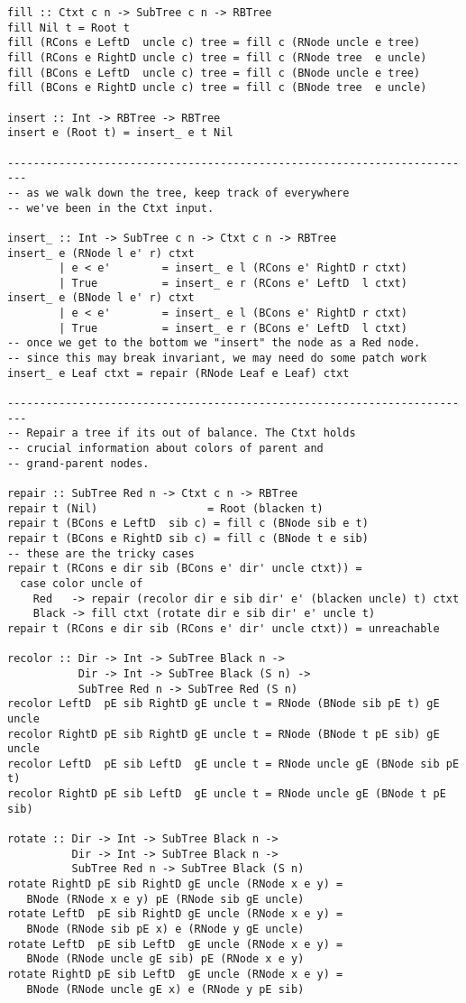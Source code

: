 \documentclass[11pt,twoside,A4]{llncs}
\begin{document}
{\begin{verbatim}
fill :: Ctxt c n -> SubTree c n -> RBTree
fill Nil t = Root t
fill (RCons e LeftD  uncle c) tree = fill c (RNode uncle e tree)
fill (RCons e RightD uncle c) tree = fill c (RNode tree  e uncle)
fill (BCons e LeftD  uncle c) tree = fill c (BNode uncle e tree)
fill (BCons e RightD uncle c) tree = fill c (BNode tree  e uncle)

insert :: Int -> RBTree -> RBTree
insert e (Root t) = insert_ e t Nil

-------------------------------------------------------------------------
-- as we walk down the tree, keep track of everywhere 
-- we've been in the Ctxt input.

insert_ :: Int -> SubTree c n -> Ctxt c n -> RBTree
insert_ e (RNode l e' r) ctxt
        | e < e'        = insert_ e l (RCons e' RightD r ctxt)
        | True          = insert_ e r (RCons e' LeftD  l ctxt)
insert_ e (BNode l e' r) ctxt
        | e < e'        = insert_ e l (BCons e' RightD r ctxt)
        | True          = insert_ e r (BCons e' LeftD  l ctxt)
-- once we get to the bottom we "insert" the node as a Red node.
-- since this may break invariant, we may need do some patch work
insert_ e Leaf ctxt = repair (RNode Leaf e Leaf) ctxt

-------------------------------------------------------------------------
-- Repair a tree if its out of balance. The Ctxt holds
-- crucial information about colors of parent and 
-- grand-parent nodes.

repair :: SubTree Red n -> Ctxt c n -> RBTree
repair t (Nil)                 = Root (blacken t)
repair t (BCons e LeftD  sib c) = fill c (BNode sib e t)
repair t (BCons e RightD sib c) = fill c (BNode t e sib)
-- these are the tricky cases
repair t (RCons e dir sib (BCons e' dir' uncle ctxt)) =
  case color uncle of
    Red   -> repair (recolor dir e sib dir' e' (blacken uncle) t) ctxt
    Black -> fill ctxt (rotate dir e sib dir' e' uncle t)
repair t (RCons e dir sib (RCons e' dir' uncle ctxt)) = unreachable

recolor :: Dir -> Int -> SubTree Black n ->
           Dir -> Int -> SubTree Black (S n) ->
           SubTree Red n -> SubTree Red (S n)
recolor LeftD  pE sib RightD gE uncle t = RNode (BNode sib pE t) gE uncle
recolor RightD pE sib RightD gE uncle t = RNode (BNode t pE sib) gE uncle
recolor LeftD  pE sib LeftD  gE uncle t = RNode uncle gE (BNode sib pE t)
recolor RightD pE sib LeftD  gE uncle t = RNode uncle gE (BNode t pE sib)

rotate :: Dir -> Int -> SubTree Black n ->
          Dir -> Int -> SubTree Black n ->
          SubTree Red n -> SubTree Black (S n)
rotate RightD pE sib RightD gE uncle (RNode x e y) = 
   BNode (RNode x e y) pE (RNode sib gE uncle)
rotate LeftD  pE sib RightD gE uncle (RNode x e y) = 
   BNode (RNode sib pE x) e (RNode y gE uncle)
rotate LeftD  pE sib LeftD  gE uncle (RNode x e y) = 
   BNode (RNode uncle gE sib) pE (RNode x e y)
rotate RightD pE sib LeftD  gE uncle (RNode x e y) = 
   BNode (RNode uncle gE x) e (RNode y pE sib)
\end{verbatim}}
\end{document}
